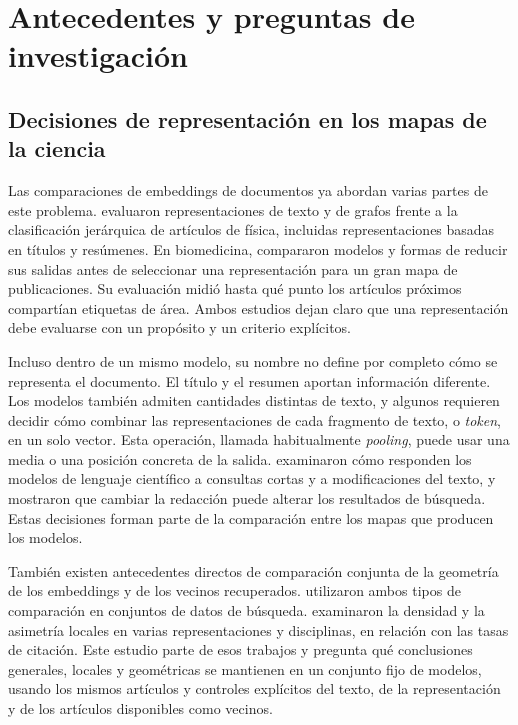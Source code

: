 \documentclass[12pt]{article}
\begin{document}
\section{Antecedentes y preguntas de investigación}
\subsection{Decisiones de representación en los mapas de la ciencia}
Las comparaciones de embeddings de documentos ya abordan varias partes de este problema. \citet{refc0e2cc29e0} evaluaron representaciones de texto y de grafos frente a la clasificación jerárquica de artículos de física, incluidas representaciones basadas en títulos y resúmenes. En biomedicina, \citet{refbe130e2973} compararon modelos y formas de reducir sus salidas antes de seleccionar una representación para un gran mapa de publicaciones. Su evaluación midió hasta qué punto los artículos próximos compartían etiquetas de área. Ambos estudios dejan claro que una representación debe evaluarse con un propósito y un criterio explícitos.

Incluso dentro de un mismo modelo, su nombre no define por completo cómo se representa el documento. El título y el resumen aportan información diferente. Los modelos también admiten cantidades distintas de texto, y algunos requieren decidir cómo combinar las representaciones de cada fragmento de texto, o \emph{token}, en un solo vector. Esta operación, llamada habitualmente \emph{pooling}, puede usar una media o una posición concreta de la salida. \citet{singh-singh-2022-inefficiency} examinaron cómo responden los modelos de lenguaje científico a consultas cortas y a modificaciones del texto, y mostraron que cambiar la redacción puede alterar los resultados de búsqueda. Estas decisiones forman parte de la comparación entre los mapas que producen los modelos.

También existen antecedentes directos de comparación conjunta de la geometría de los embeddings y de los vecinos recuperados. \citet{ref4e1e0d5582} utilizaron ambos tipos de comparación en conjuntos de datos de búsqueda. \citet{ref6da178065c} examinaron la densidad y la asimetría locales en varias representaciones y disciplinas, en relación con las tasas de citación. Este estudio parte de esos trabajos y pregunta qué conclusiones generales, locales y geométricas se mantienen en un conjunto fijo de modelos, usando los mismos artículos y controles explícitos del texto, de la representación y de los artículos disponibles como vecinos.
\end{document}
